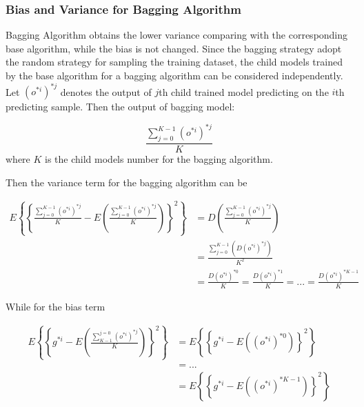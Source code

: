 \documentclass[runningheads,openany]{xhlPaper}
\begin{document}
\subsubsection{Bias and Variance for Bagging Algorithm}
Bagging Algorithm obtains the lower variance comparing with the corresponding base algorithm, while the bias is not changed. Since the bagging strategy adopt the random strategy for sampling the training dataset, the child models trained by the base algorithm for a bagging algorithm can be considered independently. Let $\left(o^{*i} \right)^{*j}$ denotes the output of $j$th child trained model predicting on the $i$th predicting sample. Then the output of bagging model:

\begin{displaymath}
\frac{\sum_{j=0}^{K-1}\left ( o^{*i} \right )^{*j}}{K}
\end{displaymath}
where $K$ is the child models number for the bagging algorithm.

Then the variance term for the bagging algorithm can be 

\begin{displaymath}
\begin{aligned}
E\left \{ \left \{ \frac{\sum_{j=0}^{K-1}\left ( o^{*i} \right )^{*j}}{K}
 - E\left ( \frac{\sum_{j=0}^{K-1}\left ( o^{*i} \right )^{*j}}{K}
 \right ) \right \}^2 \right \}&=D(\frac{\sum_{j=0}^{K-1}\left ( o^{*i} \right )^{*j}}{K})\\
 &=\frac{\sum_{j=0}^{K-1}\left ( D(o^{*i})^{*j} \right )}{K^2}\\
 &=\frac{D(o^{*i})^{*0}}{K} = \frac{D(o^{*i})^{*1}}{K} = ... = \frac{D(o^{*i})^{*K-1}}{K}
\end{aligned}
\end{displaymath}

While for the bias term 

\begin{displaymath}
\begin{aligned}
E\left \{ \left \{ g^{*i} - E\left ( \frac{\sum_{K-1}^{j=0}\left ( o^{*i} \right )^{*j}}{K}
 \right ) \right \}^2 \right \}&=E\left \{ \left \{ g^{*i} - E\left ( \left ( o^{*i} \right )^{*0} \right ) \right \}^2 \right \}\\
 &=...\\
 &=E\left \{ \left \{ g^{*i} - E\left ( \left ( o^{*i} \right )^{*K-1} \right ) \right \}^2 \right \}
\end{aligned}
\end{displaymath}
\end{document}
